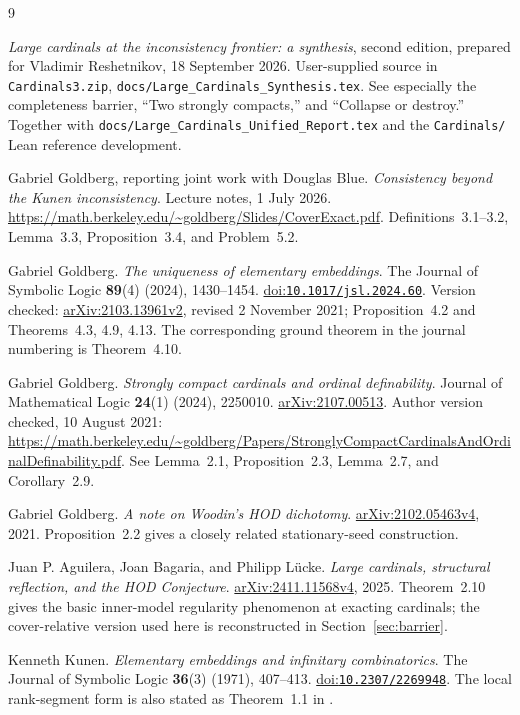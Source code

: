 \documentclass[11pt,letterpaper]{article}
\theoremstyle{definition}
\numberwithin{equation}{section}
\newcommand{\arxiv}[1]{\href{https://arxiv.org/abs/#1}{arXiv:#1}}
\newcommand{\doi}[1]{\href{https://doi.org/#1}{doi:\nolinkurl{#1}}}
\begin{document}
\clearpage
{}
{}
\begin{thebibliography}{9}

\emph{Large cardinals at the inconsistency frontier: a synthesis},
second edition, prepared for Vladimir Reshetnikov, 18 September 2026.
User-supplied source in \nolinkurl{Cardinals3.zip},
\nolinkurl{docs/Large_Cardinals_Synthesis.tex}.
See especially the completeness barrier, ``Two strongly compacts,''
and ``Collapse or destroy.'' Together with
\nolinkurl{docs/Large_Cardinals_Unified_Report.tex} and the
\nolinkurl{Cardinals/} Lean reference development.

Gabriel Goldberg, reporting joint work with Douglas Blue.
\emph{Consistency beyond the Kunen inconsistency}.
Lecture notes, 1 July 2026.
\url{https://math.berkeley.edu/~goldberg/Slides/CoverExact.pdf}.
Definitions~3.1--3.2, Lemma~3.3, Proposition~3.4, and Problem~5.2.

Gabriel Goldberg.
\emph{The uniqueness of elementary embeddings}.
The Journal of Symbolic Logic \textbf{89}(4) (2024), 1430--1454.
\doi{10.1017/jsl.2024.60}.
Version checked: \arxiv{2103.13961v2}, revised 2 November 2021;
Proposition~4.2 and Theorems~4.3, 4.9, 4.13.
The corresponding ground theorem in the journal numbering is
Theorem~4.10.

Gabriel Goldberg.
\emph{Strongly compact cardinals and ordinal definability}.
Journal of Mathematical Logic \textbf{24}(1) (2024), 2250010.
\arxiv{2107.00513}.
Author version checked, 10 August 2021:
\url{https://math.berkeley.edu/~goldberg/Papers/StronglyCompactCardinalsAndOrdinalDefinability.pdf}.
See Lemma~2.1, Proposition~2.3, Lemma~2.7, and Corollary~2.9.

Gabriel Goldberg.
\emph{A note on Woodin's HOD dichotomy}.
\arxiv{2102.05463v4}, 2021.
Proposition~2.2 gives a closely related stationary-seed construction.

Juan P. Aguilera, Joan Bagaria, and Philipp L\"ucke.
\emph{Large cardinals, structural reflection, and the HOD Conjecture}.
\arxiv{2411.11568v4}, 2025.
Theorem~2.10 gives the basic inner-model regularity phenomenon at
exacting cardinals; the cover-relative version used here is
reconstructed in Section~\ref{sec:barrier}.

Kenneth Kunen.
\emph{Elementary embeddings and infinitary combinatorics}.
The Journal of Symbolic Logic \textbf{36}(3) (1971), 407--413.
\doi{10.2307/2269948}.
The local rank-segment form is also stated as Theorem~1.1 in
\cite{cover}.

\end{thebibliography}
\end{document}

